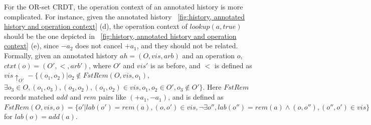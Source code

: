 \begin{remark}
  \label{remark: operation context of OR-set} For the OR-set CRDT, the
  operation context of an annotated history is more complicated.
  For instance, given the annotated history
  \figurename~\ref{fig:history, annotated history and operation context}
  (d), the operation context of $\mathit{lookup}(a,\textit{true})$
  should be the one depicted in \figurename~\ref{fig:history, annotated
    history and operation context} (e), since $-a_2$ does not cancel
  $+a_1$, and they should not be related.
  Formally, given an annotated history $ah =
  (O,\mathit{vis},\mathit{arb})$ and an operation $o$,
  $ctxt(o)=(O',<,\mathit{arb}')$, where $O'$ and $\mathit{vis}'$ is as
  before, and $<$ is defined as $\mathit{vis} \uparrow_{O'} - \{
  (o_1,o_2) \vert o_2 \notin \mathit{FstRem}(O,\mathit{vis},o_1),$
  $\exists o_3 \in O, (o_1,o_3), (o_3,o_2),(o_1,o_2) \in \mathit{vis},
  o_1,o_2 \in O', o_3 \notin O' \}$.
  {\color {red}Here $\mathit{FstRem}$ records matched $\mathit{add}$
    and $\mathit{rem}$ pairs like $(+a_1,-a_1)$,} and is defined as
  $\mathit{FstRem}(O,\mathit{vis},o) = \{o' \vert
  \mathit{lab}(o')=\mathit{rem}(a), (o,o') \in \mathit{vis}, \neg
  \exists o'', lab(o'') = \mathit{rem}(a) \wedge (o,o''),(o'',o') \in
  \mathit{vis} \}$ for $lab(o) = \mathit{add}(a)$.
\end{remark}








